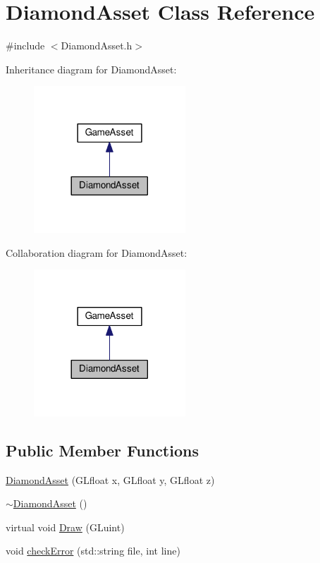 \hypertarget{classDiamondAsset}{}\section{Diamond\+Asset Class Reference}
\label{classDiamondAsset}


{\ttfamily \#include $<$Diamond\+Asset.\+h$>$}



Inheritance diagram for Diamond\+Asset\+:\nopagebreak
\begin{figure}[H]
\begin{center}
\leavevmode
\includegraphics[width=161pt]{classDiamondAsset__inherit__graph}
\end{center}
\end{figure}


Collaboration diagram for Diamond\+Asset\+:\nopagebreak
\begin{figure}[H]
\begin{center}
\leavevmode
\includegraphics[width=161pt]{classDiamondAsset__coll__graph}
\end{center}
\end{figure}
\subsection*{Public Member Functions}
\begin{DoxyCompactItemize}
\item 
\hyperlink{classDiamondAsset_a6140b65eb30ad5a4141fec20ec7f8fad}{Diamond\+Asset} (G\+Lfloat x, G\+Lfloat y, G\+Lfloat z)
\item 
\hyperlink{classDiamondAsset_a1b7bf6ba76651a9304943f2c41fe36b8}{$\sim$\+Diamond\+Asset} ()
\item 
virtual void \hyperlink{classDiamondAsset_a0c259031894623285b3b511321c73abb}{Draw} (G\+Luint)
\item 
void \hyperlink{classDiamondAsset_ad0eafff97cf565024dd085f3c8786a93}{check\+Error} (std\+::string file, int line)
\end{DoxyCompactItemize}


